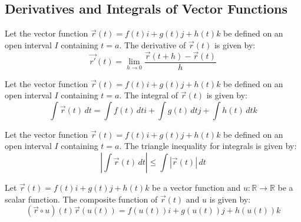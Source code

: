 \documentclass[11pt]{article}
\begin{document}
\subsection{Derivatives and Integrals of Vector Functions}
\begin{definition}[Derivative]
    Let the vector function $\vec{r}(t) = f(t)i + g(t)j + h(t)k$ be defined on an open interval $I$ containing $t = a$. The derivative of $\vec{r}(t)$ is given by:
    \begin{equation}
        \vec{r'}(t) = \lim_{h \to 0} \frac{\vec{r}(t+h) - \vec{r}(t)}{h}
    \end{equation}
\end{definition}
\begin{definition}[Integration]
    Let the vector function $\vec{r}(t) = f(t)i + g(t)j + h(t)k$ be defined on an open interval $I$ containing $t = a$. The integral of $\vec{r}(t)$ is given by:
    \begin{equation}
        \int \vec{r}(t) \, dt = \int f(t) \, dt i + \int g(t) \, dt j + \int h(t) \, dt k
    \end{equation}
\end{definition}
\begin{definition}
    Let the vector function $\vec{r}(t) = f(t)i + g(t)j + h(t)k$ be defined on an open interval $I$ containing $t = a$. The triangle inequality for integrals is given by:
    \begin{equation}
        \left| \int \vec{r}(t) \, dt \right| \le \int \left| \vec{r}(t) \right| \, dt
    \end{equation}
\end{definition}
\begin{definition}
    Let $\vec{r}(t) = f(t)i + g(t)j + h(t)k$ be a vector function and $u: \mathbb{R} \to \mathbb{R}$ be a scalar function. The composite function of $\vec{r}(t)$ and $u$ is given by:
    \begin{equation}
        (\vec{r}\circ u)(t) \vec{r}(u(t)) = f(u(t))i + g(u(t))j + h(u(t))k
    \end{equation}
\end{definition}
\end{document}
